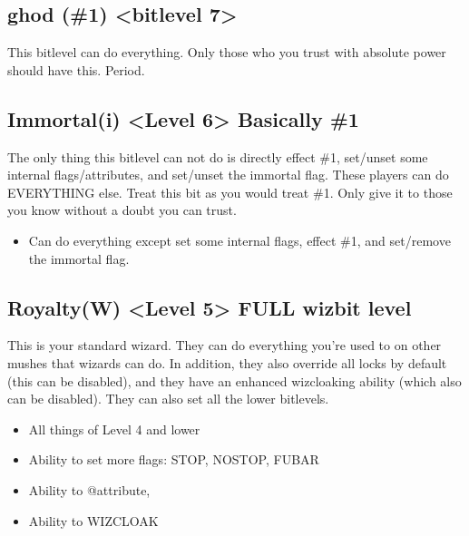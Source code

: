 \documentclass[letterpaper,10pt,english]{sphinxmanual}
\begin{document}
\subsection{ghod (\#1) \textless{}bitlevel 7\textgreater{}}
\label{\detokenize{toggles:ghod-1-bitlevel-7}}
\sphinxAtStartPar
This bitlevel can do everything.  Only those who you trust with absolute power should have this.  Period.


\subsection{Immortal(i) \textless{}Level 6\textgreater{} \sphinxhyphen{} Basically \#1}
\label{\detokenize{toggles:immortal-i-level-6-basically-1}}
\sphinxAtStartPar
The only thing this bitlevel can not do is directly effect \#1,
set/unset some internal flags/attributes, and set/unset the
immortal flag.  These players can do EVERYTHING else.  Treat
this bit as you would treat \#1.  Only give it to those you know
without a doubt you can trust.
\begin{itemize}
\item {} 
\sphinxAtStartPar
Can do everything except set some internal flags, effect \#1, and set/remove the immortal flag.

\end{itemize}


\subsection{Royalty(W) \textless{}Level 5\textgreater{} \sphinxhyphen{} FULL wizbit level}
\label{\detokenize{toggles:royalty-w-level-5-full-wizbit-level}}
\sphinxAtStartPar
This is your standard wizard.  They can do everything you’re
used to on other mushes that wizards can do.  In addition, they
also override all locks by default (this can be disabled), and
they have an enhanced wizcloaking ability (which also can be
disabled).  They can also set all the lower bitlevels.
\begin{itemize}
\item {} 
\sphinxAtStartPar
All things of Level 4 and lower

\item {} 
\sphinxAtStartPar
Ability to set more flags: STOP, NOSTOP, FUBAR

\item {} 
\sphinxAtStartPar
Ability to @attribute,

\item {} 
\sphinxAtStartPar
Ability to WIZCLOAK

\end{itemize}
\end{document}
